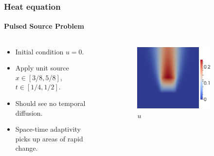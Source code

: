 \documentclass[18pt,xcolor=table]{beamer}
\begin{document}
\begin{frame}[t]
\frametitle{Heat equation}
\framesubtitle{Pulsed Source Problem}  %
\vspace{-1ex}
\begin{columns}[t] %
\begin{column}[c]{0.3\textwidth} %
\begin{itemize}
  \item Initial condition $u=0$.
  \item Apply unit source $x\in[3/8,5/8]$,\\$t\in[1/4,1/2]$.
  \item Should see no temporal diffusion.
  \item Space-time adaptivity picks up areas of rapid change.
\end{itemize}
\end{column}
\begin{column}[c]{0.7\textwidth} %
\begin{figure}[ht]
\centering
\begin{subfigure}[t]{0.45\textwidth}
\centering
\includegraphics[height=0.8\textwidth]{SpaceTimeHeat/PulseSource/u.png}
\\$u$\\\vspace{1ex}
\end{subfigure}

\end{figure}
\end{column}
\end{columns}
\end{frame}
\end{document}

